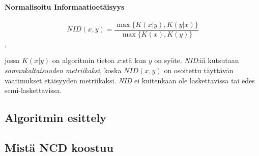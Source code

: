 \documentclass[finnish]{tktltiki2}
\theoremstyle{definition}
\theoremstyle{remark}
\begin{document}
  \paragraph{Normalisoitu Informaatioetäisyys} %
  \label{par:normalisoitu_informaatioet_isyys}
    $$ NID(x,y) = \frac{ \max\{K{(x|y)},K{(y|x)}\} }{ \max \{K(x),K(y)\}} $$,

    jossa $K(x|y)$ on algoritmin tietoa $x$:stä kun $y$ on syöte. \emph{NID}:iä kutsutaan \emph{samankaltaisuuden metriikaksi}, koska $NID(x,y)$ on osoitettu täyttävän vaatimukset etäisyyden metriikaksi. \emph{NID} ei kuitenkaan ole laskettavissa tai edes semi-laskettavissa.

\subsection{Algoritmin esittely} %
\label{sub:algoritmin_esittely}




\subsection{Mistä NCD koostuu} %
\label{sub:mist_ncd_koostuu}


%
%

%

% 





%
\end{document}
